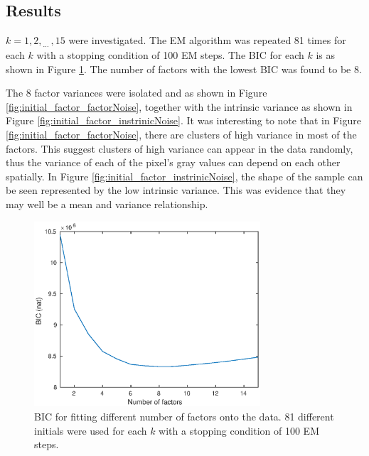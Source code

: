 \documentclass[12pt]{report}
\newcommand{\dotdotdot}{_{\phantom{.}\cdots}}
\begin{document}
\subsection{Results}
$k=1,2,\dotdotdot,15$ were investigated. The EM algorithm was repeated 81 times for each $k$ with a stopping condition of 100 EM steps. The BIC for each $k$ is as shown in Figure \ref{fig:initial_factor_BIC}. The number of factors with the lowest BIC was found to be 8.

The 8 factor variances were isolated and as shown in Figure \ref{fig:initial_factor_factorNoise}, together with the intrinsic variance as shown in Figure \ref{fig:initial_factor_instrinicNoise}. It was interesting to note that in Figure \ref{fig:initial_factor_factorNoise}, there are clusters of high variance in most of the factors. This suggest clusters of high variance can appear in the data randomly, thus the variance of each of the pixel's gray values can depend on each other spatially. In Figure \ref{fig:initial_factor_instrinicNoise}, the shape of the sample can be seen represented by the low intrinsic variance. This was evidence that they may well be a mean and variance relationship.

\begin{figure}
	\centering
	\includegraphics[width=0.75\textwidth]{figures/initial_factor_BIC.eps}
	\caption{BIC for fitting different number of factors onto the data. 81 different initials were used for each $k$ with a stopping condition of 100 EM steps.}
	\label{fig:initial_factor_BIC}
\end{figure}
\end{document}
